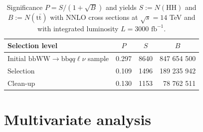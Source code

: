 \documentclass[10pt,a4paper]{article}
\newcommand{\cc}[1]{\multicolumn{1}{c}{#1}} %
\renewcommand{\H}{\text{H}}
\renewcommand{\tt}{\ensuremath{\text{t}\bar{\text{t}}}}
\newcommand{\sAN}{$\sigma_1$}
\begin{document}
\begin{table}[h]
	\centering
	\caption{Significance $P=S/(1+\sqrt{B})$ and yields $S:=N(\H\H)$ and $B:=N(\tt)$ with NNLO cross sections at $\sqrt{s}=14$ TeV and with integrated luminosity $L = 3000 \text{ fb}^{-1}$.} %
	\begin{tabular}{@{\;}lrrr@{\;}}
	
	\toprule
	Selection level & \cc{$P$} & \cc{$S$} & \cc{$B$} \\
	\midrule
	Initial $\text{bbWW} \rightarrow \text{bb}qq\ell\nu$ sample
		& 0.297 &   8640  & 847 654 500  \\
	Selection
 		& 0.109 &   1496  & 189 235 942  \\
	Clean-up
 		& 0.130 &   1153  &  78 762 511  \\
	\bottomrule
	
	\end{tabular}
\end{table}





\section{Multivariate analysis}
\end{document}
